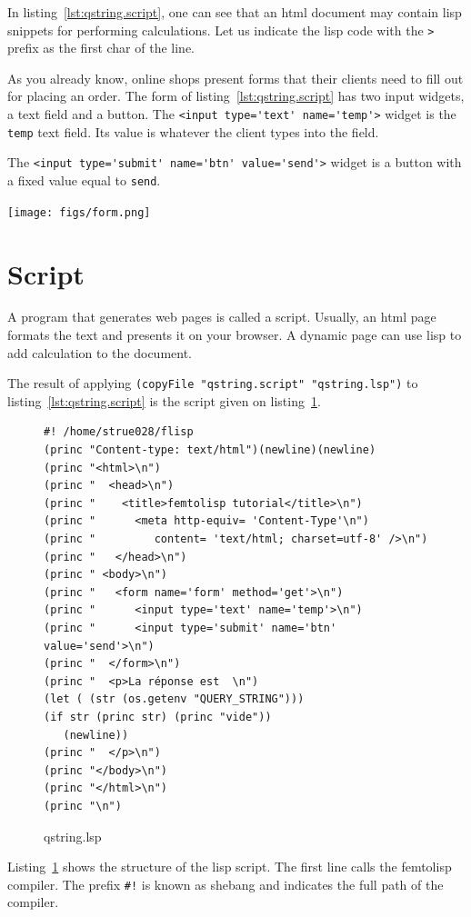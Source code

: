 \documentclass[a4paper,12pt]{book}
\begin{document}
In listing~\ref{lst:qstring.script}, one can see
that an html document may contain lisp
snippets for performing calculations. Let us
indicate the lisp code with the \verb|>| prefix
as the first char of the line.

As you already know, online shops
present forms that their clients need to fill out
for placing an order. The form of
listing~\ref{lst:qstring.script}
has two input widgets, a text field and
a button. The \verb|<input type='text' name='temp'>|
widget is the \verb|temp| text field.
Its value is whatever the client types into the field.

The \verb|<input type='submit' name='btn' value='send'>|
widget is a button with a fixed value equal to \verb|send|.

\texttt{[image: figs/form.png]}

\section{Script}
A program that generates
web pages is called a script.
Usually, an html page formats the text
and presents it on your browser.
A dynamic page can use lisp to add
calculation to the document.

The result of applying 
\verb|(copyFile "qstring.script" "qstring.lsp")|
to  listing~\ref{lst:qstring.script}
is the script given on listing~\ref{lst:qstring.lsp}.

\begin{figure}[!h]
\begin{verbatim}
#! /home/strue028/flisp
(princ "Content-type: text/html")(newline)(newline)
(princ "<html>\n")
(princ "  <head>\n")
(princ "    <title>femtolisp tutorial</title>\n")
(princ "      <meta http-equiv= 'Content-Type'\n")
(princ "         content= 'text/html; charset=utf-8' />\n")
(princ "   </head>\n")
(princ " <body>\n")
(princ "   <form name='form' method='get'>\n")
(princ "      <input type='text' name='temp'>\n")
(princ "      <input type='submit' name='btn' value='send'>\n")
(princ "  </form>\n")
(princ "  <p>La réponse est  \n")
(let ( (str (os.getenv "QUERY_STRING")))
(if str (princ str) (princ "vide"))
   (newline))
(princ "  </p>\n")
(princ "</body>\n")
(princ "</html>\n")
(princ "\n")
\end{verbatim}
\caption{qstring.lsp}
\label{lst:qstring.lsp}
\end{figure}

Listing~\ref{lst:qstring.lsp} shows
the structure of the lisp script.
The first line calls the femtolisp
compiler. The prefix \verb|#!|
is known as shebang and indicates
the full path of the compiler.
\end{document}
